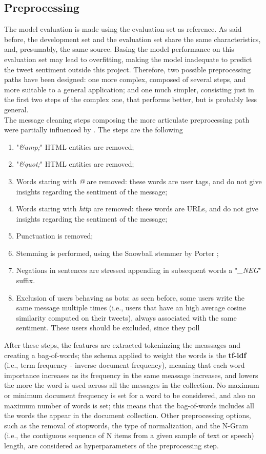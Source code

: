 \documentclass[conference]{IEEEtran}
\begin{document}
\subsection{Preprocessing}
The model evaluation is made using the evaluation set as reference. As said before, the development set and the evaluation set share the same characteristics, and, presumably, the same source. Basing the model performance on this evaluation set may lead to overfitting, making the model inadequate to predict the tweet sentiment outside this project. Therefore, two possible preprocessing paths have been designed: one more complex, composed of several steps, and more suitable to a general application; and one much simpler, consisting just in the first two steps of the complex one, that performs better, but is probably less general. \\
The message cleaning steps composing the more articulate preprocessing path were partially influenced by \cite{ZainuddinNurulhuda2016TFSa}. The steps are the following
\begin{enumerate}
    \item "\textit{\&amp;}" HTML entities are removed;
    \item "\textit{\&quot;}" HTML entities are removed; 
    \item Words staring with \textit{@} are removed: these words are user tags, and do not give insights regarding the sentiment of the message; 
    \item Words staring with \textit{http} are removed: these words are URLs, and do not give insights regarding the sentiment of the message;
    \item Punctuation is removed;
    \item Stemming is performed, using the Snowball stemmer by Porter \cite{Porter2006};
    \item Negations in sentences are stressed appending in subsequent words a "\textit{\_NEG}" suffix.
    \item Exclusion of users behaving as bots: as seen before, some users write the same message multiple times (i.e., users that have an high average cosine similarity computed on their tweets), always associated with the same sentiment. These users should be excluded, since they poll
\end{enumerate}
After these steps, the features are extracted tokeninzing the meassages and creating a bag-of-words; the schema applied to weight the words is the \textbf{tf-idf} (i.e., term frequency - inverse document frequency), meaning that each word importance increases as its frequency in the same meassage increases, and lowers the more the word is used across all the messages in the collection. No maximum or minimum document frequency is set for a word to be considered, and also no maximum number of words is set; this means that the bag-of-words includes all the words the appear in the document collection. Other preprocessing options, such as the removal of stopwords, the type of normalization, and the N-Gram (i.e., the contiguous sequence of N items from a given sample of text or speech) length, are considered as hyperparameters of the preprocessing step.
\end{document}
